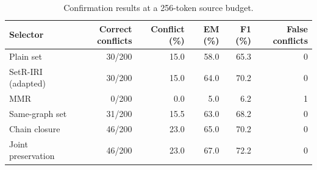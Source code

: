 \begin{table}[pos=H]
\caption{Confirmation results at a 256-token source budget.}\label{tab:confirmation}
\centering\small
\setlength{\tabcolsep}{6pt}
\begin{tabular}{lrrrrr}
\toprule
Selector & Correct conflicts & Conflict (\%) & EM (\%) & F1 (\%) & False conflicts \\
\midrule
Plain set & 30/200 & 15.0 & 58.0 & 65.3 & 0 \\
SetR-IRI (adapted) & 30/200 & 15.0 & 64.0 & 70.2 & 0 \\
MMR & 0/200 & 0.0 & 5.0 & 6.2 & 1 \\
Same-graph set & 31/200 & 15.5 & 63.0 & 68.2 & 0 \\
Chain closure & 46/200 & 23.0 & 65.0 & 70.2 & 0 \\
Joint preservation & 46/200 & 23.0 & 67.0 & 72.2 & 0 \\
\bottomrule
\end{tabular}
\end{table}
